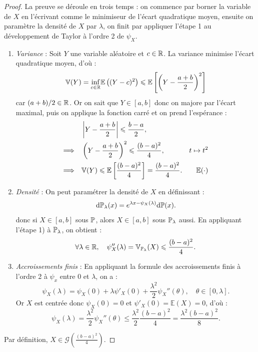 \begin{proof}
    La preuve se déroule en trois temps : on commence par borner la variable de $X$ en l'écrivant comme le minimiseur de l'écart quadratique moyen, ensuite on paramètre la densité de $X$ par $ \lambda$, on finit par appliquer l'étape 1 au développement de Taylor à l'ordre 2 de $ \psi_X$. 
    \begin{enumerate}
        \item \emph{Variance} : Soit $Y$ une variable aléatoire et $ c \in \mathbb{R}$. La variance minimise l'écart quadratique moyen, d'où : 
        $$ 
            \mathbb{V}(Y) = \underset{c \in \mathbb{R}}{\inf} \mathbb{E} \left( (Y - c)^2\right) 
            \leqslant \mathbb{E} \left[ \left( Y - \frac{a + b}{2}\right)^2\right]
        $$
        car $ (a + b)/2 \in \mathbb{R}$. Or on sait que $ Y \in [a,b]$ donc on majore par l'écart maximal, puis on applique la fonction carré et on prend l'espérance : 
        \begin{align*}
            &  \left| Y - \frac{a + b}{2}\right| \leqslant \frac{b-a}{2}, \\ 
            \Longrightarrow \quad & \left( Y - \frac{a + b}{2}\right)^2 \leqslant \frac{(b-a)^2}{4}, & t \mapsto t^2 \\ 
            \Longrightarrow \quad & \mathbb{V}(Y) \leqslant \mathbb{E} \left[ \frac{(b - a)^2}{4}\right] = \frac{(b-a)^2}{4}. & \mathbb{E}(\cdot)
        \end{align*}
        \item \emph{Densité} : On peut paramétrer la densité de $X$ en définissant : 
        $$ 
            \dd \mathbb{P}_\lambda (x) = e^{ \lambda x - \psi_X( \lambda)} \dd \mathbb{P}(x). 
        $$
        donc si $X \in [a,b]$ sous $ \mathbb{P}$, alors $ X \in [a,b]$ sous $ \mathbb{P}_\lambda$ aussi. En appliquant l'étape 1) à $ \mathbb{P}_\lambda$, on obtient : 
        $$ 
            \forall \lambda \in \mathbb{R}, \quad 
            \psi''_X( \lambda) = \mathbb{V}_{ \mathbb{P}_\lambda} (X) \leqslant \frac{(b-a)^2}{4}. 
        $$
        \item \emph{Accroissements finis} : En appliquant la formule des accroissements finis à l'ordre 2 à $ \psi_x$ entre $0$ et $ \lambda$, on a : 
        $$ 
            \psi_X( \lambda) = \psi_X(0) + \lambda \psi'_X(0) + \frac{ \lambda^2}{2} \psi_X''( \theta), \quad \theta \in [0, \lambda]. 
        $$
        Or $X$ est centrée donc $ \psi_X(0) = 0$ et $ \psi'_X(0) = \mathbb{E}(X) = 0$, d'où : 
        $$ 
            \psi_X( \lambda) = \frac{ \lambda^2}{2} \psi_X''( \theta) \leqslant \frac{ \lambda^2}{2} \frac{(b-a)^2}{4} = \frac{ \lambda^2(b-a)^2}{8}. 
        $$
    \end{enumerate}
    Par définition, $X \in \mathcal{G} \left( \frac{(b-a)^2}{4}\right)$. 
\end{proof}

